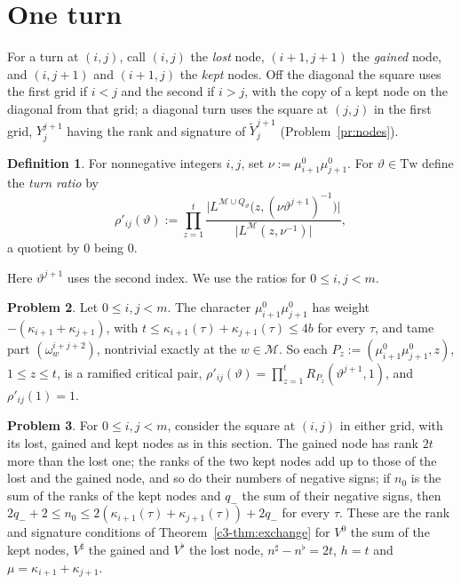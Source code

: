 \documentclass[reqno]{amsart}
\theoremstyle{definition}
\newtheorem{problem}{Problem}[section]
\newtheorem{definition}[problem]{Definition}
\theoremstyle{plain}
\newcommand{\Tw}{\mathrm{Tw}}
\newcommand{\cM}{\mathcal M}
\newcommand{\Yt}{\widetilde Y}
\newcommand{\ns}{n^\sharp}
\newcommand{\nb}{n^\flat}
\begin{document}
\section{One turn}\label{sec:one-turn}

For a turn at \((i, j)\), call \((i,j)\) the \emph{lost} node, \((i+1,j+1)\) the \emph{gained} node, and \((i, j+1)\) and \((i+1, j)\) the \emph{kept} nodes.  Off the diagonal the square uses the first grid if \(i < j\) and the second if \(i > j\), with the copy of a kept node on the diagonal from that grid; a diagonal turn uses the square at \((j, j)\) in the first grid, \(Y^{j+1}_j\) having the rank and signature of \(\Yt^{j+1}_j\) (Problem~\ref{pr:nodes}).

\begin{definition}\label{def:turn-ratio}
For nonnegative integers \(i, j\), set \(\nu := \mu^0_{i+1}\mu^0_{j+1}\).  For \(\vartheta \in \Tw\) define the \emph{turn ratio} by
\[
  \rho'_{ij}(\vartheta) := \prod_{z=1}^{t} \frac{\lvert L^{\cM \cup Q_\vartheta}\bigl(z, (\nu\vartheta^{j+1})^{-1}\bigr)\rvert}{\lvert L^{\cM}(z, \nu^{-1})\rvert} ,
\]
a quotient by \(0\) being \(0\).
\end{definition}

Here \(\vartheta^{j+1}\) uses the second index.  We use the ratios for \(0 \le i, j < m\).

\begin{problem}\label{pr:turn-pair}
Let \(0 \le i, j < m\).  The character \(\mu^0_{i+1}\mu^0_{j+1}\) has weight \(-(\kappa_{i+1} + \kappa_{j+1})\), with \(t \le \kappa_{i+1}(\tau) + \kappa_{j+1}(\tau) \le 4b\) for every \(\tau\), and tame part \((\omega_w^{i+j+2})\), nontrivial exactly at the \(w \in \cM\).  So each \(P_z := (\mu^0_{i+1}\mu^0_{j+1}, z)\), \(1 \le z \le t\), is a ramified critical pair, \(\rho'_{ij}(\vartheta) = \prod_{z=1}^t R_{P_z}(\vartheta^{j+1}, 1)\), and \(\rho'_{ij}(1) = 1\).
\end{problem}

\begin{problem}\label{pr:turn-ranks}
For \(0 \le i, j < m\), consider the square at \((i, j)\) in either grid, with its lost, gained and kept nodes as in this section.  The gained node has rank \(2t\) more than the lost one; the ranks of the two kept nodes add up to those of the lost and the gained node, and so do their numbers of negative signs; if \(n_0\) is the sum of the ranks of the kept nodes and \(q_-\) the sum of their negative signs, then \(2q_- + 2 \le n_0 \le 2(\kappa_{i+1}(\tau) + \kappa_{j+1}(\tau)) + 2q_-\) for every \(\tau\).  These are the rank and signature conditions of Theorem~\ref{c3-thm:exchange} for \(V^0\) the sum of the kept nodes, \(V^\sharp\) the gained and \(V^\flat\) the lost node, \(\ns - \nb = 2t\), \(h = t\) and \(\mu = \kappa_{i+1} + \kappa_{j+1}\).
\end{problem}
\end{document}
